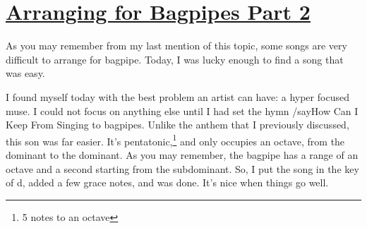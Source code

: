 \documentclass[12pt]{article}[titlepage]
\newcommand{\1}{\={a}}
\newcommand{\2}{\={e}}
\newcommand{\3}{\={\i}}
\newcommand{\4}{\=o}
\newcommand{\5}{\=u}
\newcommand{\6}{\={A}}
\renewcommand{\,}{\textsuperscript{,}}
\begin{document}
\doublespacing

\section{\href{arranging-for-bagpipes-ii.html}{Arranging for Bagpipes Part 2}
}

As you may remember from my last mention of this topic, some songs are very difficult to arrange for bagpipe. Today, I was lucky enough to find a song that was easy.

I found myself today with the best problem an artist can have: a hyper focused muse. I could not focus on anything else until I had set the hymn /say{How Can I Keep From Singing} to bagpipes. Unlike the anthem that I previously discussed, this son was far easier. It’s pentatonic,\footnote{5 notes to an octave} and only occupies an octave, from the dominant to the dominant. As you may remember, the bagpipe has a range of an octave and a second starting from the subdominant. So, I put the song in the key of d, added a few grace notes, and was done. It’s nice when things go well.
\end{document}
